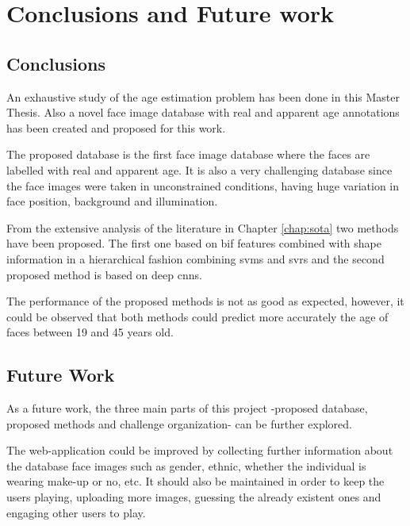\chapter{Conclusions and Future work} \label{chap:conclusions}

\section{Conclusions}

An exhaustive study of the age estimation problem has been done in this Master Thesis. Also a novel face image database with real and apparent age annotations has been created and proposed for this work.

The proposed database is the first face image database where the faces are labelled with real and apparent age. It is also a very challenging database since the face images were taken in unconstrained conditions, having huge variation in face position, background and illumination.





From the extensive analysis of the literature in Chapter \ref{chap:sota} two methods have been proposed. The first one based on \gls{bif} features combined with shape information in a hierarchical fashion combining \glspl{svm} and \glspl{svr} and the second proposed method is based on deep \glspl{cnn}.

The performance of the proposed methods is not as good as expected, however, it could be observed that both methods could predict more accurately the age of faces between 19 and 45 years old. 

\section{Future Work}

As a future work, the three main parts of this project -proposed database, proposed methods and challenge organization- can be further explored.

The web-application could be improved by collecting further information about the database face images such as gender, ethnic, whether the individual is wearing make-up or no, etc. It should also be maintained in order to keep the users playing, uploading more images, guessing the already existent ones and engaging other users to play.

